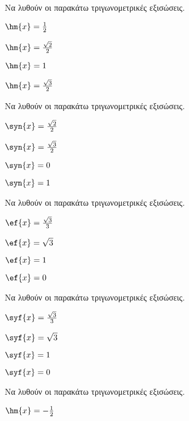 \Alyta
\begin{multicols}{2}
\Askhsh 
Να λυθούν οι παρακάτω τριγωνομετρικές εξισώσεις.
\begin{multicols}{2}
\begin{rlist}
\item $ \hm{x}=\frac{1}{2} $
\item $ \hm{x}=\frac{\sqrt{2}}{2} $
\item $ \hm{x}=1 $
\item $ \hm{x}=\frac{\sqrt{3}}{2} $
\end{rlist}
\end{multicols}
\Askhsh 
Να λυθούν οι παρακάτω τριγωνομετρικές εξισώσεις.
\begin{multicols}{2}
\begin{rlist}
\item $ \syn{x}=\frac{\sqrt{2}}{2} $
\item $ \syn{x}=\frac{\sqrt{3}}{2} $
\item $ \syn{x}=0 $
\item $ \syn{x}=1 $
\end{rlist}
\end{multicols}
\Askhsh 
Να λυθούν οι παρακάτω τριγωνομετρικές εξισώσεις.
\begin{multicols}{2}
\begin{rlist}
\item $ \ef{x}=\frac{\sqrt{3}}{3} $
\item $ \ef{x}=\sqrt{3} $
\item $ \ef{x}=1 $
\item $ \ef{x}=0 $
\end{rlist}
\end{multicols}
\Askhsh 
Να λυθούν οι παρακάτω τριγωνομετρικές εξισώσεις.
\begin{multicols}{2}
\begin{rlist}
\item $ \syf{x}=\frac{\sqrt{3}}{3} $
\item $ \syf{x}=\sqrt{3} $
\item $ \syf{x}=1 $
\item $ \syf{x}=0 $
\end{rlist}
\end{multicols}
\Askhsh 
Να λυθούν οι παρακάτω τριγωνομετρικές εξισώσεις.
\begin{multicols}{2}
\begin{rlist}
\item $ \hm{x}=-\frac{1}{2} $

\end{rlist}
\end{multicols}
\end{multicols}
